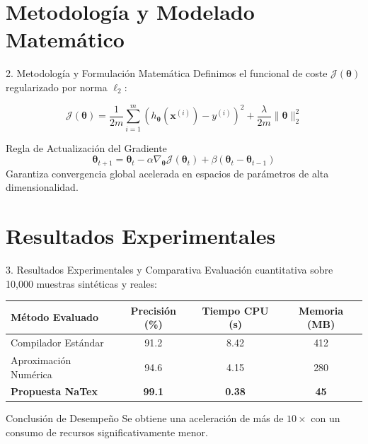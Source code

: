 \documentclass[aspectratio=169, 11pt]{beamer}
\begin{document}
\section{Metodología y Modelado Matemático}
\begin{frame}{2. Metodología y Formulación Matemática}
  Definimos el funcional de coste $\mathcal{J}(\boldsymbol{\theta})$ regularizado por norma $\ell_2$:
  
  \begin{equation}
    \mathcal{J}(\boldsymbol{\theta}) = \frac{1}{2m} \sum_{i=1}^{m} \left( h_{\boldsymbol{\theta}}(\mathbf{x}^{(i)}) - y^{(i)} \right)^2 + \frac{\lambda}{2m} \|\boldsymbol{\theta}\|_2^2
  \end{equation}

  \begin{exampleblock}{Regla de Actualización del Gradiente}
    \begin{equation}
      \boldsymbol{\theta}_{t+1} = \boldsymbol{\theta}_t - \alpha \nabla_{\boldsymbol{\theta}} \mathcal{J}(\boldsymbol{\theta}_t) + \beta (\boldsymbol{\theta}_t - \boldsymbol{\theta}_{t-1})
    \end{equation}
    Garantiza convergencia global acelerada en espacios de parámetros de alta dimensionalidad.
  \end{exampleblock}
\end{frame}

\section{Resultados Experimentales}
\begin{frame}{3. Resultados Experimentales y Comparativa}
  Evaluación cuantitativa sobre 10,000 muestras sintéticas y reales:

  \vspace{0.3cm}
  \begin{table}[h]
    \centering
    \begin{tabular}{lccc}
      \toprule
      \textbf{Método Evaluado} & \textbf{Precisión (\%)} & \textbf{Tiempo CPU (s)} & \textbf{Memoria (MB)} \\
      \midrule
      Compilador Estándar & 91.2 & 8.42 & 412 \\
      Aproximación Numérica & 94.6 & 4.15 & 280 \\
      \textbf{Propuesta NaTex} & \textbf{99.1} & \textbf{0.38} & \textbf{45} \\
      \bottomrule
    \end{tabular}
  \end{table}

  \vspace{0.4cm}
  \begin{alertblock}{Conclusión de Desempeño}
    Se obtiene una aceleración de más de $10\times$ con un consumo de recursos significativamente menor.
  \end{alertblock}
\end{frame}
\end{document}
